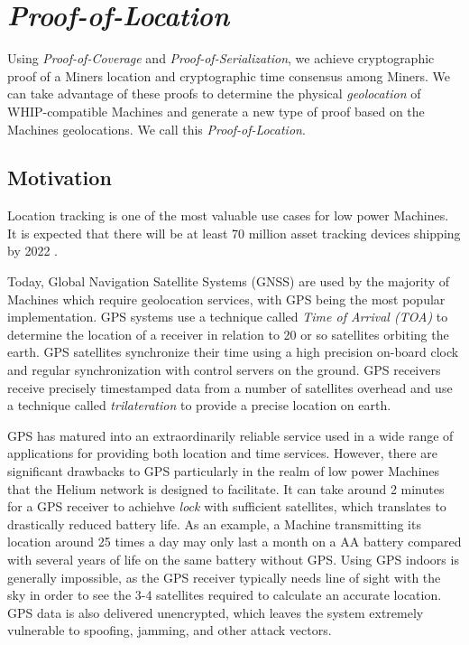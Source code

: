 \documentclass[10pt, nonatbib, nocopyrightspace, reprint]{sigplanconf}
\begin{document}
\section{\emph{Proof-of-Location}} \label{geolocation}

Using \emph{Proof-of-Coverage} and \emph{Proof-of-Serialization}, we achieve cryptographic proof of a Miners location and cryptographic time consensus among Miners. We can take advantage of these proofs to determine the physical \emph{geolocation} of WHIP-compatible Machines and generate a new type of proof based on the Machines geolocations. We call this \emph{Proof-of-Location}.

\subsection{Motivation}

Location tracking is one of the most valuable use cases for low power Machines. It is expected that there will be at least 70 million asset tracking devices shipping by 2022 \cite{mobile-experts}.

Today, Global Navigation Satellite Systems (GNSS) are used by the majority of Machines which require geolocation services, with GPS being the most popular implementation. GPS systems use a technique called \emph{Time of Arrival (TOA)} to determine the location of a receiver in relation to 20 or so satellites orbiting the earth. GPS satellites synchronize their time using a high precision on-board clock and regular synchronization with control servers on the ground. GPS receivers receive precisely timestamped data from a number of satellites overhead and use a technique called \emph{trilateration} to provide a precise location on earth.

GPS has matured into an extraordinarily reliable service used in a wide range of applications for providing both location and time services. However, there are significant drawbacks to GPS particularly in the realm of low power Machines that the Helium network is designed to facilitate. It can take around 2 minutes for a GPS receiver to achiehve \emph{lock} with sufficient satellites, which translates to drastically reduced battery life. As an example, a Machine transmitting its location around 25 times a day may only last a month on a AA battery compared with several years of life on the same battery without GPS. Using GPS indoors is generally impossible, as the GPS receiver typically needs line of sight with the sky in order to see the 3-4 satellites required to calculate an accurate location. GPS data is also delivered unencrypted, which leaves the system extremely vulnerable to spoofing, jamming, and other attack vectors.
\end{document}
